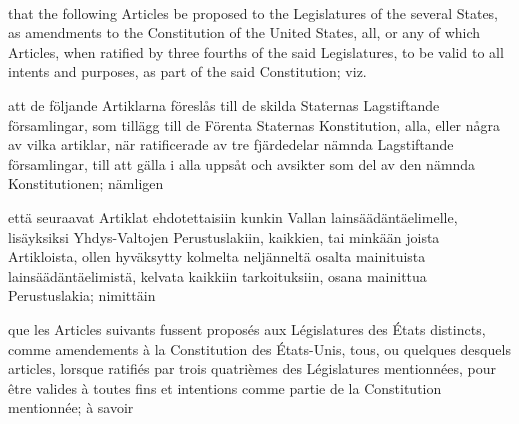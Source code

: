 \documentclass[a4,landscape,12pt]{article}
\begin{document}
~

\begin{minipage}[t]{0.22\textwidth}
that the following Articles be proposed to the Legislatures of the several States, as amendments to the Constitution of the United States, all, or any of which Articles, when ratified by three fourths of the said Legislatures, to be valid to all intents and purposes, as part of the said Constitution; viz.
\end{minipage}\textwidth
\begin{minipage}[t]{0.22\textwidth}
att de följande Artiklarna föreslås till de skilda Staternas Lagstiftande församlingar, som tillägg till de Förenta Staternas Konstitution, alla, eller några av vilka artiklar, när ratificerade av tre fjärdedelar nämnda Lagstiftande församlingar, till att gälla i alla uppsåt och avsikter som del av den nämnda Konstitutionen; nämligen
\end{minipage}\textwidth
\begin{minipage}[t]{0.22\textwidth}
että seuraavat Artiklat ehdotettaisiin kunkin Vallan lainsäädäntäelimelle, lisäyksiksi Yhdys-Valtojen Perustuslakiin, kaikkien, tai minkään joista Artikloista, ollen hyväksytty kolmelta neljänneltä osalta mainituista lainsäädäntäelimistä, kelvata kaikkiin tarkoituksiin, osana mainittua Perustuslakia; nimittäin
\end{minipage}\textwidth
\begin{minipage}[t]{0.22\textwidth}
que les Articles suivants fussent proposés aux Législatures des États distincts, comme amendements à la Constitution des États-Unis, tous, ou quelques desquels articles, lorsque ratifiés par trois quatrièmes des Législatures mentionnées, pour être valides à toutes fins et intentions comme partie de la Constitution mentionnée; à savoir
\end{minipage}
~
\end{document}
